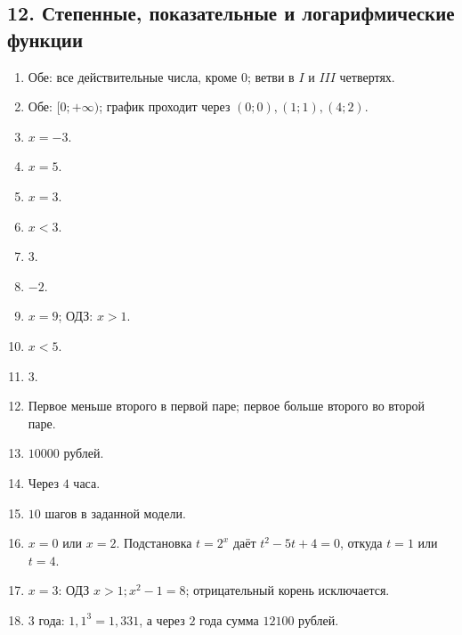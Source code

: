 \documentclass[12pt,a4paper]{article}
\theoremstyle{definition}
\theoremstyle{plain}
\theoremstyle{remark}
\newcommand{\starmark}{\ensuremath{{}^{\ast}}}
\begin{document}
\subsection*{12. Степенные, показательные и логарифмические функции}
\begin{enumerate}[label=12.\arabic*.,leftmargin=2.8em,itemsep=5pt]
\item Обе: все действительные числа, кроме \(0\); ветви в \(I\) и \(III\) четвертях.
\item Обе: \([0;\allowbreak + \infty )\); график проходит через \((0;\allowbreak 0),\allowbreak (1;\allowbreak 1),\allowbreak (4;\allowbreak 2)\).
\item \(x = - 3\).
\item \(x = 5\).
\item \(x = 3\).
\item \(x < 3\).
\item \(3\).
\item \(- 2\).
\item \(x = 9\); ОДЗ: \(x > 1\).
\item \(x < 5\).
\item \(3\).
\item Первое меньше второго в первой паре; первое больше второго во второй паре.
\item \(10000\) рублей.
\item Через \(4\) часа.
\item \(10\) шагов в заданной модели.
\item[\textbf{12.16.}\starmark] \(x = 0\) или \(x = 2\). Подстановка \(t = 2^{x}\) даёт \(t^{2} - 5t + 4 = 0\), откуда \(t = 1\) или \(t = 4\).
\item[\textbf{12.17.}\starmark] \(x = 3\): ОДЗ \(x > 1;\allowbreak x^{2} - 1 = 8\); отрицательный корень исключается.
\item[\textbf{12.18.}\starmark] \(3\) года: \(1,1^{3} = 1,331\), а через \(2\) года сумма \(12100\) рублей.
\end{enumerate}
\end{document}
